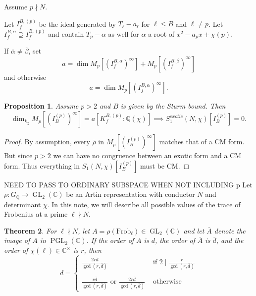\documentclass[11pt]{amsart}
\theoremstyle{plain}
\newtheorem{thm}{Theorem}[section]
\newtheorem{prop}[thm]{Proposition}
\theoremstyle{definition}
\newcommand{\Q}{{\mathbb Q}}
\newcommand{\C}{{\mathbb C}}
\DeclareMathOperator{\PGL}{PGL}
\DeclareMathOperator{\GL}{GL}
\newcommand{\rhobar}{\overline{\rho}}
\newcommand{\Frob}{\text{Frob}}
\renewcommand{\[}{\left[}
\renewcommand{\]}{\right]}
\newcommand{\dbar}{\overline{d}}
\begin{document}
Assume $p \nmid N$.

Let $I_f^{B,(p)}$ be the ideal generated by $T_\ell - a_\ell$ for $\ell \leq B$ and $\ell \neq p$.  Let $I_f^{B,\alpha} \supseteq I_f^{B,(p)}$ and contain $T_p - \alpha$ as well for $\alpha$ a root of $x^2 - a_px + \chi(p)$.

If $\overline{\alpha} \neq \overline{\beta}$, set
$$
a = \dim M_p[(I_f^{B,\alpha})^\infty] + M_p[(I_f^{B,\beta})^\infty]
$$
and otherwise
$$
a = \dim M_p[(I_f^{B,\alpha})^\infty].
$$

\begin{prop}
Assume $p > 2$ and $B$ is given by the Sturm bound.  Then
$$
\dim_{k_\chi} M_p[(I_B^{(p)})^\infty] = a [K_f^{B,(p)}:\Q(\chi)]
\implies
S_1^{exotic}(N,\chi)[I_B^{(p)}] = 0.
$$
\end{prop}

\begin{proof}
By assumption, every $\rhobar$ in $M_p[(I_B^{(p)})^\infty]$ matches that of a CM form.  But since $p>2$ we can have no congruence between an exotic form and a CM form.  Thus everything in $S_1(N,\chi)[I_B^{(p)}]$ must be CM.
\end{proof}

NEED TO PASS TO ORDINARY SUBSPACE WHEN NOT INCLUDING p
\vfill
\pagebreak
Let $\rho : G_{\Q} \to \GL_2(\C)$ be an Artin representation with conductor $N$ and determinant $\chi$.  In this note, we will describe all possible values of the trace of Frobenius at a prime $\ell \nmid N$.  

\begin{thm}
For $\ell \nmid N$, let $A = \rho(\Frob_\ell) \in \GL_2(\C)$ and let $\overline{A}$ denote the image of $A$ in $\PGL_2(\C)$.  If the order of $A$ is $d$, the order of $\overline{A}$ is $\overline{d}$, and the order of $\chi(\ell) \in \C^\times$ is $r$, then 
$$
d = \begin{cases}
\frac{2 r \dbar}{\gcd(r,\dbar)} & \text{~if~} 2 \mid \frac{r}{\gcd(r,\dbar)} \\ 
~\\
\frac{r \dbar}{\gcd(r,\dbar)} \text{~or~} \frac{2 r \dbar}{\gcd(r,\dbar)} & \text{~otherwise}
\end{cases}
$$
\end{thm}
\end{document}
